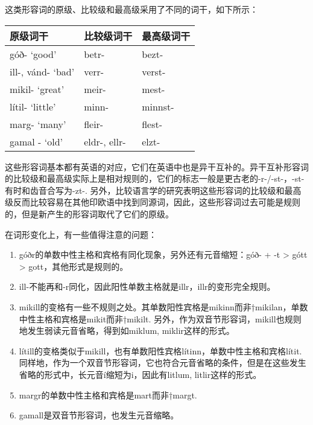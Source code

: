 这类形容词的原级、比较级和最高级采用了不同的词干，如下所示：

\begin{longtable}{lll}
  \toprule
  原级词干          & 比较级词干   & 最高级词干 \\
  \midrule
  \endhead
  \bottomrule
  \endfoot
  góð- `good‌'       & betr-        & bezt-      \\
  ill-, vánd- `bad‌' & verr-        & verst-     \\
  mikil- `great‌'    & meir-        & mest-      \\
  lítil- `little‌'   & minn-        & minnst-    \\
  marg- `many‌'      & fleir-       & flest-     \\
  gamal - `old‌'     & eldr-, ellr- & elzt-      \\
\end{longtable}

这些形容词基本都有英语的对应，它们在英语中也是异干互补的。异干互补形容词的比较级和最高级实际上是相对规则的，它们的标志一般是更古老的-r-/-st-，-st-有时和齿音合写为-zt-.
另外，比较语言学的研究表明这些形容词的比较级和最高级反而比较容易在其他印欧语中找到同源词，因此，这些形容词过去可能是规则的，但是新产生的形容词取代了它们的原级。

在词形变化上，有一些值得注意的问题：

\begin{enumerate}
  \def\labelenumi{\alph{enumi})}
  \item
        góðr的单数中性主格和宾格有同化现象，另外还有元音缩短：góð- + -t
        \textgreater{} gótt \textgreater{} gott，其他形式是规则的。
  \item
        ill-不能再和-r同化，因此阳性单数主格就是illr，illr的变形完全规则。
  \item
        mikill的变格有一些不规则之处。其单数阳性宾格是mikinn而非†mikilan，单数中性主格和宾格是mikit而非†mikilt.
        另外，作为双音节形容词，mikill也规则地发生弱读元音省略，得到如miklum,
        miklir这样的形式。
  \item
        lítill的变格类似于mikill，也有单数阳性宾格lítinn，单数中性主格和宾格lítit.
        同样地，作为一个双音节形容词，它也符合元音省略的条件，但是在这些发生省略的形式中，长元音í缩短为i，因此有litlum,
        litlir这样的形式。
  \item
        margr的单数中性主格和宾格是mart而非†margt.
  \item
        gamall是双音节形容词，也发生元音缩略。
\end{enumerate}

